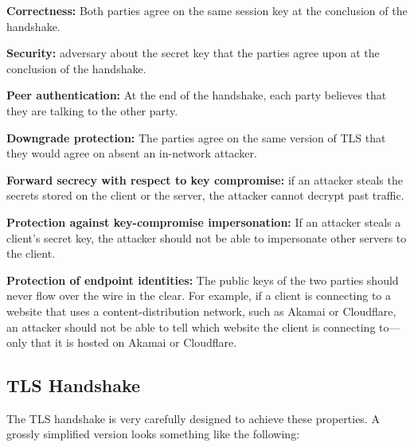 \begin{compactitem}
\item \textbf{Correctness:} Both parties agree on the same session key 
        at the conclusion of the handshake.
      \item \textbf{Security:} adversary  about the secret
        key that the parties agree upon at the conclusion of the handshake.
      \item \textbf{Peer authentication:} At the end of the handshake, each party believes that they are talking to the other party.
      \item \textbf{Downgrade protection:} The parties agree on the same version of TLS that they would agree on absent an in-network attacker.
      \item \textbf{Forward secrecy with respect
        to key compromise:} if an attacker
        steals the secrets stored on the client or the server, 
        the attacker cannot decrypt past traffic.
      \item \textbf{Protection against key-compromise impersonation:} If an attacker steals a client's secret key, the attacker should not be able to impersonate other servers to the client.
      \item \textbf{Protection of endpoint
        identities:} The public keys of the two
        parties should never flow over the wire in
        the clear. For example, if a client is
        connecting to a website that uses
        a content-distribution network, such as
        Akamai or Cloudflare, an attacker should
        not be able to tell which website the
        client is connecting to---only that it is
        hosted on Akamai or Cloudflare.
\end{compactitem}

\subsection{TLS Handshake}
The TLS handshake is very carefully designed to achieve these properties. A grossly simplified version looks something like the following:

